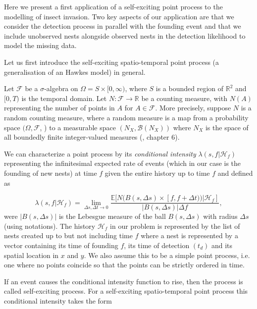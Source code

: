 \documentclass{article}
\begin{document}
Here we present a first application of a self-exciting point process to the modelling of insect invasion. Two key aspects of our application are that we consider the detection process in parallel with the founding event and that we include unobserved nests alongside observed nests in the detection likelihood to model the missing data.

Let us first introduce the self-exciting spatio-temporal point process (a generalisation of an Hawkes model) \cite{Hawkes71} in general.

Let $\mathcal{F}$ be a $\sigma$-algebra on $\Omega = S \times [0, \infty )$, where $S$ is a bounded region of $\mathbb{R}^2$ and $[0, T)$ is the temporal domain. Let $N: \mathcal{F} \to \mathbb{R}$ be a counting measure, with $N(A)$ representing the number of points in $A$ for $A \in \mathcal{F}$. More precisely, suppose $N$ is a random counting measure, where a random measure is a map from a probability space $(\Omega, \mathcal{F}$, ) to a measurable space $(N_{X}, \mathcal{B}(N_{X}))$ where $N_{X}$ is the space of all boundedly finite integer-valued measures (\cite{Daley}, chapter 6). 

We can characterize a point process by its \textit{conditional intensity} $\lambda(s, f | \mathcal{H}_f)$ representing the infinitesimal expected rate of events (which in our case is the founding of new nests) at time $f$ given the entire history up to time $f$ and defined as 

\begin{equation*}
    \lambda (s, f | \mathcal{H}_f) = \lim_{\Delta s, \Delta t \rightarrow 0} \frac{\mathbb{E}\big[N (B(s, \Delta s) \times [f, f + \Delta t)) | \mathcal{H}_f]}{|B(s, \Delta s)| \Delta f},
\end{equation*}
were $|B(s, \Delta s)|$ is the Lebesgue measure of the ball $B(s, \Delta s)$ with radius $\Delta s$ (using \cite{Reinhart} notations). The history $\mathcal{H}_f$ in our problem is represented by the list of nests created up to but not including time $f$ where a nest is represented by a vector containing its time of founding $f$, its time of detection $(t_d)$ and its spatial location in $x$ and $y$. We also assume this to be a simple point process, i.e. one where no points coincide so that the points can be strictly ordered in time.

If an event causes the conditional intensity function to rise, then the process is called self-exciting process. For a self-exciting spatio-temporal point process this conditional intensity takes the form
\end{document}

